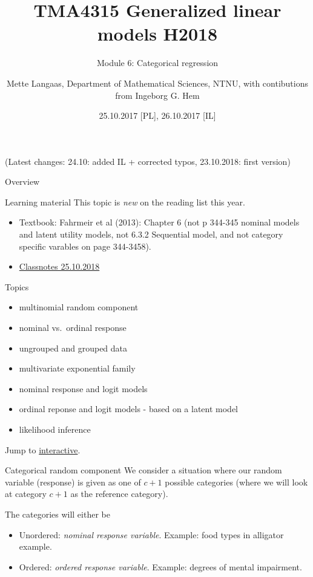 \documentclass[
  ignorenonframetext,
]{beamer}
\title{TMA4315 Generalized linear models H2018}
\subtitle{Module 6: Categorical regression}
\author{Mette Langaas, Department of Mathematical Sciences, NTNU, with
contibutions from Ingeborg G. Hem}
\date{25.10.2017 {[}PL{]}, 26.10.2017 {[}IL{]}}
\providecommand{\tightlist}{%
  \setlength{\itemsep}{0pt}\setlength{\parskip}{0pt}}
\begin{document}
\frame{\titlepage}

\begin{frame}
(Latest changes: 24.10: added IL + corrected typos, 23.10.2018: first
version)
\end{frame}

\begin{frame}{Overview}
\label{overview}
\begin{block}{Learning material}
\label{learning-material}
This topic is \emph{new} on the reading list this year.

\begin{itemize}
\tightlist
\item
  Textbook: Fahrmeir et al (2013): Chapter 6 (not p 344-345 nominal
  models and latent utility models, not 6.3.2 Sequential model, and not
  category specific varables on page 344-3458).
\item
  \href{https://www.math.ntnu.no/emner/TMA4315/2018h/M62018.pdf}{Classnotes
  25.10.2018}
\end{itemize}
\end{block}
\end{frame}

\begin{frame}
\begin{block}{Topics}
\label{topics}
\begin{itemize}
\item
  multinomial random component
\item
  nominal vs.~ordinal response
\item
  ungrouped and grouped data
\item
  multivariate exponential family
\item
  nominal response and logit models
\item
  ordinal reponse and logit models - based on a latent model
\item
  likelihood inference
\end{itemize}

Jump to \hyperlink{interactive}{interactive}.
\end{block}
\end{frame}

\begin{frame}{Categorical random component}
\label{categorical-random-component}
We consider a situation where our random variable (response) is given as
one of \(c+1\) possible categories (where we will look at category
\(c+1\) as the reference category).

The categories will either be

\begin{itemize}
\tightlist
\item
  Unordered: \emph{nominal response variable}. Example: food types in
  alligator example.
\item
  Ordered: \emph{ordered response variable}. Example: degrees of mental
  impairment.
\end{itemize}
\end{frame}
\end{document}
